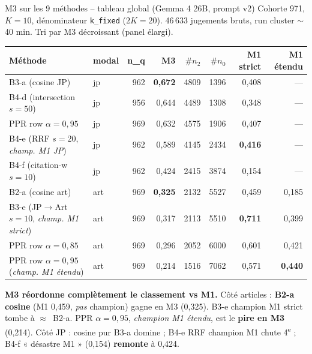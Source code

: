 \documentclass[aspectratio=169,10pt]{beamer}
\newcommand{\warnbox}[1]{%
  \begin{center}
  \colorbox{red!10}{\parbox{0.92\linewidth}{\centering #1}}
  \end{center}}
\begin{document}
\begin{frame}{M3 sur les 9 méthodes -- tableau global (Gemma 4 26B, prompt v2)}
  \scriptsize
  Cohorte 971, $K{=}10$, dénominateur \texttt{k\_fixed} ($2K{=}20$). 46\,633 jugements bruts, run cluster $\sim$40 min.
  Tri par M3 décroissant (panel élargi).

  \vspace{0.3em}
  \renewcommand{\arraystretch}{1.1}
  \setlength{\tabcolsep}{4pt}
  \begin{center}
  \begin{tabular}{@{}l l r r r r | r r@{}}
    \toprule
    \textbf{Méthode} & \textbf{modal} & \textbf{n\_q} & \textbf{M3} & $\#n_2$ & $\#n_0$ & \textbf{M1 strict} & \textbf{M1 étendu} \\
    \midrule
    \rowcolor{green!10}
    B3-a (cosine JP)              & jp  & 962 & \textbf{0,672} & 4809 & 1396 & 0,408 & --- \\
    B4-d (intersection $s{=}50$)   & jp  & 956 & 0,644 & 4489 & 1308 & 0,348 & --- \\
    PPR row $\alpha=0{,}95$        & jp  & 969 & 0,632 & 4575 & 1906 & 0,407 & --- \\
    \rowcolor{accentsoft}
    B4-e (RRF $s{=}20$, \emph{champ. M1 JP}) & jp  & 962 & 0,589 & 4145 & 2434 & \textbf{0,416} & --- \\
    B4-f (citation-w $s{=}10$)    & jp  & 962 & 0,424 & 2415 & 3874 & 0,154 & --- \\
    \midrule
    \rowcolor{green!10}
    B2-a (cosine art)             & art & 969 & \textbf{0,325} & 2132 & 5527 & 0,459 & 0,185 \\
    \rowcolor{accentsoft}
    B3-e (JP$\to$Art $s{=}10$, \emph{champ. M1 strict}) & art & 969 & 0,317 & 2113 & 5510 & \textbf{0,711} & 0,399 \\
    PPR row $\alpha=0{,}85$        & art & 969 & 0,296 & 2052 & 6000 & 0,601 & 0,421 \\
    \rowcolor{red!10}
    PPR row $\alpha=0{,}95$ (\emph{champ. M1 étendu}) & art & 969 & 0,214 & 1516 & 7062 & 0,571 & \textbf{0,440} \\
    \bottomrule
  \end{tabular}
  \end{center}

  \vspace{0.4em}
  \warnbox{\scriptsize \textbf{M3 réordonne complètement le classement vs M1.}
  Côté articles : \textbf{B2-a cosine} (M1 0,459, \emph{pas} champion) gagne en M3 (0,325).
  B3-e champion M1 strict tombe à $\approx$~B2-a. PPR $\alpha=0{,}95$, \emph{champion M1 étendu},
  est le \textbf{pire en M3} (0,214). Côté JP : cosine pur B3-a domine ; B4-e RRF
  champion M1 chute 4\textsuperscript{e} ; B4-f « désastre M1 » (0,154) \textbf{remonte} à 0,424.}
\end{frame}
\end{document}
